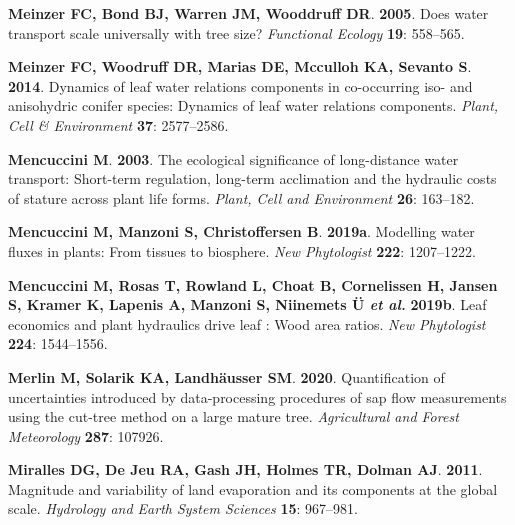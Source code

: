 \documentclass[11pt,twoside]{reedthesis}
\begin{document}
\hypertarget{ref-Meinzer2005}{}
\textbf{\textnormal{Meinzer FC}, \textnormal{Bond BJ},
\textnormal{Warren JM}, \textnormal{Wooddruff DR}}. \textbf{2005}. Does
water transport scale universally with tree size? \emph{Functional
Ecology} \textbf{19}: 558--565.

\hypertarget{ref-meinzer_dynamics_2014}{}
\textbf{\textnormal{Meinzer FC}, \textnormal{Woodruff DR},
\textnormal{Marias DE}, \textnormal{Mcculloh KA}, \textnormal{Sevanto
S}}. \textbf{2014}. Dynamics of leaf water relations components in
co-occurring iso- and anisohydric conifer species: Dynamics of leaf
water relations components. \emph{Plant, Cell \& Environment}
\textbf{37}: 2577--2586.

\hypertarget{ref-mencuccini_ecological_2003}{}
\textbf{\textnormal{Mencuccini M}}. \textbf{2003}. The ecological
significance of long-distance water transport: Short-term regulation,
long-term acclimation and the hydraulic costs of stature across plant
life forms. \emph{Plant, Cell and Environment} \textbf{26}: 163--182.

\hypertarget{ref-mencuccinimodelling2019}{}
\textbf{\textnormal{Mencuccini M}, \textnormal{Manzoni S},
\textnormal{Christoffersen B}}. \textbf{2019a}. Modelling water fluxes
in plants: From tissues to biosphere. \emph{New Phytologist}
\textbf{222}: 1207--1222.

\hypertarget{ref-mencuccini_leaf_2019}{}
\textbf{\textnormal{Mencuccini M}, \textnormal{Rosas T},
\textnormal{Rowland L}, \textnormal{Choat B}, \textnormal{Cornelissen
H}, \textnormal{Jansen S}, \textnormal{Kramer K}, \textnormal{Lapenis
A}, \textnormal{Manzoni S}, \textnormal{Niinemets Ü} \emph{et al.}}
\textbf{2019b}. Leaf economics and plant hydraulics drive leaf : Wood
area ratios. \emph{New Phytologist} \textbf{224}: 1544--1556.

\hypertarget{ref-Merlin2020}{}
\textbf{\textnormal{Merlin M}, \textnormal{Solarik KA},
\textnormal{Landhäusser SM}}. \textbf{2020}. Quantification of
uncertainties introduced by data-processing procedures of sap flow
measurements using the cut-tree method on a large mature tree.
\emph{Agricultural and Forest Meteorology} \textbf{287}: 107926.

\hypertarget{ref-Miralles2011}{}
\textbf{\textnormal{Miralles DG}, \textnormal{De Jeu RA},
\textnormal{Gash JH}, \textnormal{Holmes TR}, \textnormal{Dolman AJ}}.
\textbf{2011}. Magnitude and variability of land evaporation and its
components at the global scale. \emph{Hydrology and Earth System
Sciences} \textbf{15}: 967--981.
\end{document}
